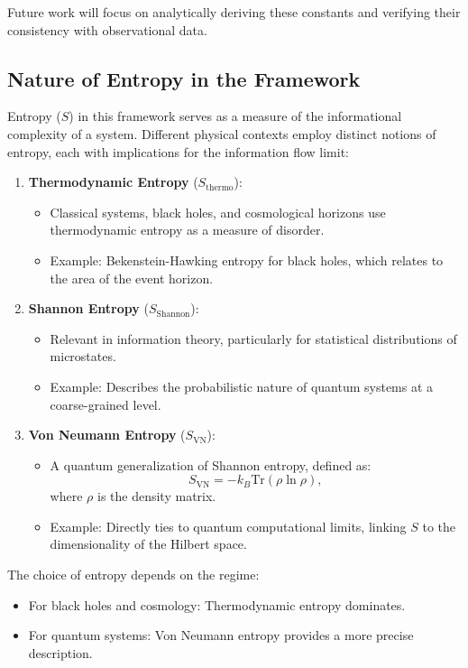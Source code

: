 \documentclass[12pt]{article}
\begin{document}
Future work will focus on analytically deriving these constants and verifying their consistency with observational data.

\subsection{Nature of Entropy in the Framework}
Entropy (\( S \)) in this framework serves as a measure of the informational complexity of a system. Different physical contexts employ distinct notions of entropy, each with implications for the information flow limit:
\begin{enumerate}
    \item \textbf{Thermodynamic Entropy} (\( S_{\text{thermo}} \)):
    \begin{itemize}
        \item Classical systems, black holes, and cosmological horizons use thermodynamic entropy as a measure of disorder.
        \item Example: Bekenstein-Hawking entropy for black holes, which relates to the area of the event horizon.
    \end{itemize}
    \item \textbf{Shannon Entropy} (\( S_{\text{Shannon}} \)):
    \begin{itemize}
        \item Relevant in information theory, particularly for statistical distributions of microstates.
        \item Example: Describes the probabilistic nature of quantum systems at a coarse-grained level.
    \end{itemize}
    \item \textbf{Von Neumann Entropy} (\( S_{\text{VN}} \)):
    \begin{itemize}
        \item A quantum generalization of Shannon entropy, defined as:
        \[
        S_{\text{VN}} = -k_B \text{Tr}(\rho \ln \rho),
        \]
        where \( \rho \) is the density matrix.
        \item Example: Directly ties to quantum computational limits, linking \( S \) to the dimensionality of the Hilbert space.
    \end{itemize}
\end{enumerate}

The choice of entropy depends on the regime:
\begin{itemize}
    \item For black holes and cosmology: Thermodynamic entropy dominates.
    \item For quantum systems: Von Neumann entropy provides a more precise description.
\end{itemize}
\end{document}
